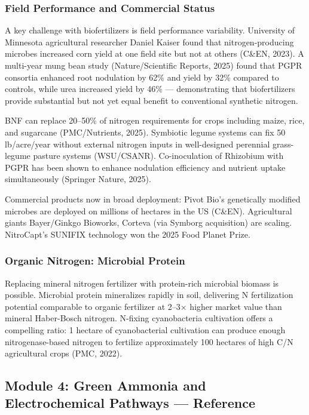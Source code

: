 \documentclass[11pt,letterpaper]{article}
\begin{document}
\subsubsection{Field Performance and Commercial Status}

A key challenge with biofertilizers is field performance variability. University of Minnesota agricultural researcher Daniel Kaiser found that nitrogen-producing microbes increased corn yield at one field site but not at others (C\&EN, 2023). A multi-year mung bean study (Nature/Scientific Reports, 2025) found that PGPR consortia enhanced root nodulation by 62\% and yield by 32\% compared to controls, while urea increased yield by 46\% --- demonstrating that biofertilizers provide substantial but not yet equal benefit to conventional synthetic nitrogen.

BNF can replace 20--50\% of nitrogen requirements for crops including maize, rice, and sugarcane (PMC/Nutrients, 2025). Symbiotic legume systems can fix 50 lb/acre/year without external nitrogen inputs in well-designed perennial grass-legume pasture systems (WSU/CSANR). Co-inoculation of Rhizobium with PGPR has been shown to enhance nodulation efficiency and nutrient uptake simultaneously (Springer Nature, 2025).

Commercial products now in broad deployment: Pivot Bio's genetically modified microbes are deployed on millions of hectares in the US (C\&EN). Agricultural giants Bayer/Ginkgo Bioworks, Corteva (via Symborg acquisition) are scaling. NitroCapt's SUNIFIX technology won the 2025 Food Planet Prize.

\subsubsection{Organic Nitrogen: Microbial Protein}

Replacing mineral nitrogen fertilizer with protein-rich microbial biomass is possible. Microbial protein mineralizes rapidly in soil, delivering N fertilization potential comparable to organic fertilizer at 2--3$\times$ higher market value than mineral Haber-Bosch nitrogen. N-fixing cyanobacteria cultivation offers a compelling ratio: 1 hectare of cyanobacterial cultivation can produce enough nitrogenase-based nitrogen to fertilize approximately 100 hectares of high C/N agricultural crops (PMC, 2022).

\subsection{Module 4: Green Ammonia and Electrochemical Pathways --- Reference}
\end{document}
